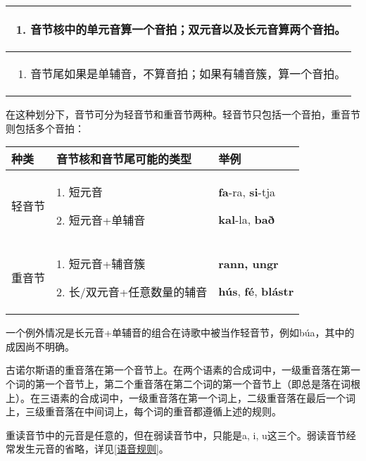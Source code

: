 \begin{longtable}{l}
  \toprule
  \begin{enumerate}\def\labelenumi{\arabic{enumi}.}\item  音节核中的单元音算一个音拍；双元音以及长元音算两个音拍。\end{enumerate} \\
  \midrule
  \endhead
  \bottomrule
  \endfoot
  \begin{minipage}[t]{\linewidth}\raggedright
    \begin{enumerate}
      \def\labelenumi{\arabic{enumi}.}
      \setcounter{enumi}{1}
      \item
            音节尾如果是单辅音，不算音拍；如果有辅音簇，算一个音拍。
    \end{enumerate}
  \end{minipage}                                                                   \\
\end{longtable}

在这种划分下，音节可分为轻音节和重音节两种。轻音节只包括一个音拍，重音节则包括多个音拍：

\begin{longtable}{lll}
  \toprule
  种类               & 音节核和音节尾可能的类型                    & 举例 \\
  \midrule
  \endhead
  \bottomrule
  \endfoot
  轻音节              & 1. 短元音

  2. 短元音+单辅音       & \textbf{fa}-ra, \textbf{si}-tja

  \textbf{kal}-la, \textbf{bað}                           \\
  重音节              & 1. 短元音+辅音簇

  2. 长/双元音+任意数量的辅音 & \textbf{rann, ungr}

  \textbf{hús}, \textbf{fé}, \textbf{blástr}              \\
\end{longtable}

一个例外情况是长元音+单辅音的组合在诗歌中被当作轻音节，例如búa，其中的成因尚不明确。

古诺尔斯语的重音落在第一个音节上。在两个语素的合成词中，一级重音落在第一个词的第一个音节上，第二个重音落在第二个词的第一个音节上（即总是落在词根上）。在三语素的合成词中，一级重音落在第一个词上，二级重音落在最后一个词上，三级重音落在中间词上，每个词的重音都遵循上述的规则。

重读音节中的元音是任意的，但在弱读音节中，只能是a, i,
u这三个。弱读音节经常发生元音的省略，详见\ref{语音规则}。

